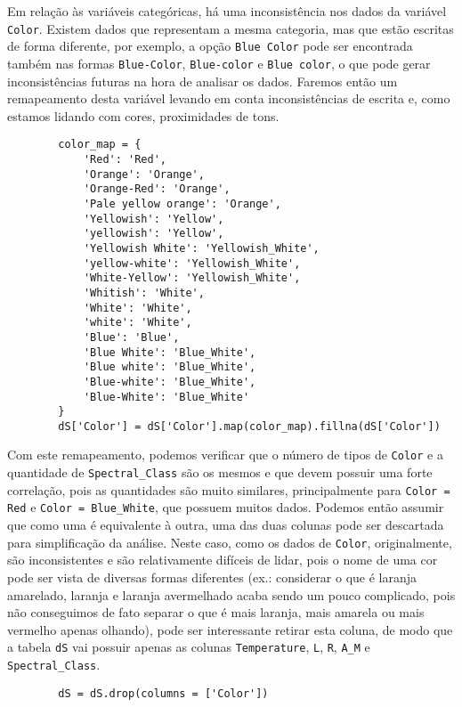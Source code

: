 Em relação às variáveis categóricas, há uma inconsistência nos dados da variável \verb|Color|. Existem dados que representam a mesma categoria, mas que estão escritas de forma diferente, por exemplo, a opção \verb|Blue Color| pode ser encontrada também nas formas \verb|Blue-Color|, \verb|Blue-color| e \verb|Blue color|, o que pode gerar inconsistências futuras na hora de analisar os dados. Faremos então um remapeamento desta variável levando em conta inconsistências de escrita e, como estamos lidando com cores, proximidades de tons.
\begin{longlisting}
    \begin{verbatim}
        color_map = {
            'Red': 'Red',
            'Orange': 'Orange',
            'Orange-Red': 'Orange',
            'Pale yellow orange': 'Orange',
            'Yellowish': 'Yellow',
            'yellowish': 'Yellow',
            'Yellowish White': 'Yellowish_White',
            'yellow-white': 'Yellowish_White',
            'White-Yellow': 'Yellowish_White',
            'Whitish': 'White',
            'White': 'White',
            'white': 'White',
            'Blue': 'Blue',
            'Blue White': 'Blue_White',
            'Blue white': 'Blue_White',
            'Blue-white': 'Blue_White',
            'Blue-White': 'Blue_White'
        }
        dS['Color'] = dS['Color'].map(color_map).fillna(dS['Color'])
    \end{verbatim}
\end{longlisting}

Com este remapeamento, podemos verificar que o número de tipos de \verb|Color| e a quantidade de \verb|Spectral_Class| são os mesmos e que devem possuir uma forte correlação, pois as quantidades são muito similares, principalmente para \verb|Color = Red| e \verb|Color = Blue_White|, que possuem muitos dados. Podemos então assumir que como uma é equivalente à outra, uma das duas colunas pode ser descartada para simplificação da análise. Neste caso, como os dados de \verb|Color|, originalmente, são inconsistentes e são relativamente difíceis de lidar, pois o nome de uma cor pode ser vista de diversas formas diferentes (ex.: considerar o que é laranja amarelado, laranja e laranja avermelhado acaba sendo um pouco complicado, pois não conseguimos de fato separar o que é mais laranja, mais amarela ou mais vermelho apenas olhando), pode ser interessante retirar esta coluna, de modo que a tabela \verb|dS| vai possuir apenas as colunas \verb|Temperature|, \verb|L|, \verb|R|, \verb|A_M| e \verb|Spectral_Class|.
\begin{longlisting}
    \begin{verbatim}
        dS = dS.drop(columns = ['Color'])
    \end{verbatim}
\end{longlisting}

